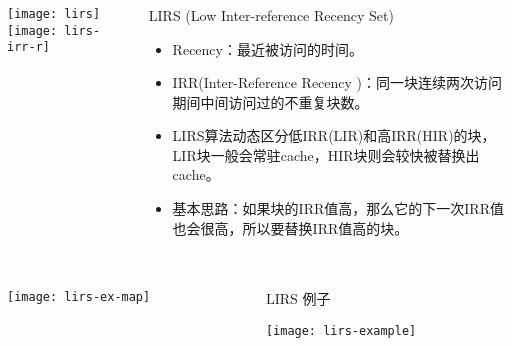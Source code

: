 \begin{frame}[plain]
	\frametitle{ }
	\begin{columns}
		\begin{column}{.5\textwidth}
			\centering
			\texttt{[image: lirs]}
			\texttt{[image: lirs-irr-r]}
		\end{column}
		
		\begin{column}{.5\textwidth}
			LIRS (Low Inter-reference Recency Set)\textbf{}
				
				\begin{itemize}
					\item Recency：最近被访问的时间。
					\item IRR(Inter-Reference Recency )：同一块连续两次访问期间中间访问过的不重复块数。
					\item  LIRS算法动态区分低IRR(LIR)和高IRR(HIR)的块，LIR块一般会常驻cache，HIR块则会较快被替换出cache。
					\item 基本思路：如果块的IRR值高，那么它的下一次IRR值也会很高，所以要替换IRR值高的块。

					
				\end{itemize}
			
		\end{column}
		
		
	\end{columns}
\end{frame}


\begin{frame}[plain]
	\frametitle{ }
	\begin{columns}
		\begin{column}{.4\textwidth}
			\centering
				\texttt{[image: lirs-ex-map]}
		\end{column}
		
		\begin{column}{.6\textwidth}
			LIRS 例子
			
		\texttt{[image: lirs-example]}
			
		\end{column}
		
		
	\end{columns}
\end{frame}



